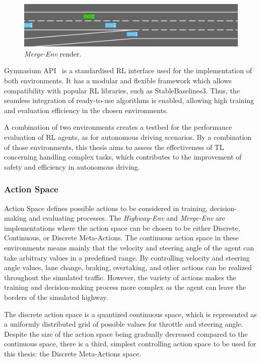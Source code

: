 \begin{figure}[H]
    \centering
    \includegraphics[width=\textwidth]{images/Merge.png}
    \caption{\emph{Merge-Env} render.}
    \label{fig:iterations_plot}
\end{figure}

Gymnasium API~\cite{towers2024gymnasiumstandardinterfacereinforcement} is a standardised RL interface used for the implementation of both environments. It has a modular and flexible framework which allows compatibility with popular RL libraries, such as StableBaselines3. Thus, the seamless integration of ready-to-use algorithms is enabled, allowing high training and evaluation efficiency in the chosen environments.

A combination of two environments creates a testbed for the performance evaluation of RL agents, as for autonomous driving scenarios. By a combination of those environments, this thesis aims to assess the effectiveness of TL concerning handling complex tasks, which contributes to the improvement of safety and efficiency in autonomous driving.

\subsubsection{Action Space}\label{sec:action_space}

Action Space defines possible actions to be considered in training, decision-making and evaluating processes. The \emph{Highway-Env} and \emph{Merge-Env} are implementations where the action space can be chosen to be either Discrete, Continuous, or Discrete Meta-Actions. The continuous action space in these environments means mainly that the velocity and steering angle of the agent can take arbitrary values in a predefined range. By controlling velocity and steering angle values, lane change, braking, overtaking, and other actions can be realized throughout the simulated traffic. However, the variety of actions makes the training and decision-making process more complex as the agent can leave the borders of the simulated highway. 

The discrete action space is a quantized continuous space, which is represented as a uniformly distributed grid of possible values for throttle and steering angle. Despite the size of the action space being gradually decreased compared to the continuous space, there is a third, simplest controlling action space to be used for this thesis: the Discrete Meta-Actions space. 

